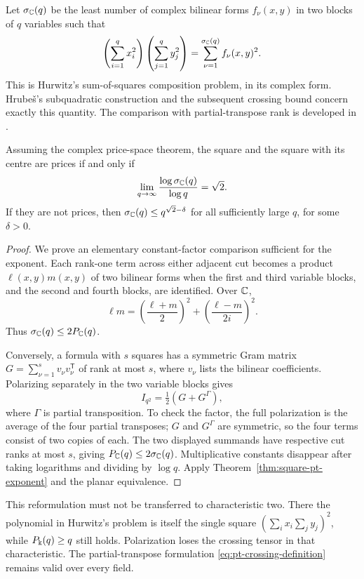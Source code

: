 Let $\sigma_\mathbb C(q)$ be the least number of complex bilinear forms
$f_\nu(x,y)$ in two blocks of $q$ variables such that
\[
 \left(\sum_{i=1}^q x_i^2\right)
 \left(\sum_{j=1}^q y_j^2\right)
      =\sum_{\nu=1}^{\sigma_\mathbb C(q)}f_\nu(x,y)^2.
\]
This is Hurwitz's sum-of-squares composition problem, in its
complex form. Hrube\v{s}'s subquadratic construction
\cite[Theorem 1]{Hrubes2026} and the subsequent crossing bound
\cite[Corollary 3]{Khoruzhii2026} concern exactly this quantity.
The comparison with partial-transpose rank is developed in
\cite[Lemmas 3.12--3.14]{RossmanZhu2026}.

\begin{corollary}
\label{cor:square-hurwitz}
Assuming the complex price-space theorem, the square and the
square with its centre are prices if and only if
\[
 \lim_{q\to\infty}\frac{\log\sigma_\mathbb C(q)}{\log q}=\sqrt2.
\]
If they are not prices, then
$\sigma_\mathbb C(q)\leq q^{\sqrt2-\delta}$ for all sufficiently
large $q$, for some $\delta>0$.
\end{corollary}
\begin{proof}
We prove an elementary constant-factor comparison sufficient
for the exponent.
Each rank-one term across either adjacent cut becomes a product
$\ell(x,y)m(x,y)$ of two bilinear forms when the first and
third variable blocks, and the second and fourth blocks, are
identified. Over $\mathbb C$,
\[
 \ell m=\left(\frac{\ell+m}{2}\right)^2+
         \left(\frac{\ell-m}{2i}\right)^2.
\]
Thus $\sigma_\mathbb C(q)\leq2P_\mathbb C(q)$.

Conversely, a formula with $s$ squares has a symmetric Gram
matrix $G=\sum_{\nu=1}^s v_\nu v_\nu^{\mathsf T}$ of rank
at most $s$, where $v_\nu$ lists the bilinear coefficients.
Polarizing separately in the two variable blocks gives
\[
 I_{q^2}=\tfrac12(G+G^\Gamma),
\]
where $\Gamma$ is partial transposition. To check the factor,
the full polarization is the average of the four partial
transposes; $G$ and $G^\Gamma$ are symmetric, so the four
terms consist of two copies of each. The two displayed
summands have respective cut ranks at most $s$, giving
$P_\mathbb C(q)\leq2\sigma_\mathbb C(q)$.
Multiplicative constants disappear after taking logarithms
and dividing by $\log q$. Apply
Theorem~\ref{thm:square-pt-exponent} and the planar equivalence.
\end{proof}

This reformulation must not be transferred to characteristic
two. There the polynomial in Hurwitz's problem is itself the
single square $(\sum_i x_i\sum_j y_j)^2$, while
$P_\Bbbk(q)\geq q$ still holds. Polarization loses the crossing
tensor in that characteristic. The partial-transpose formulation
\eqref{eq:pt-crossing-definition} remains valid over every field.

